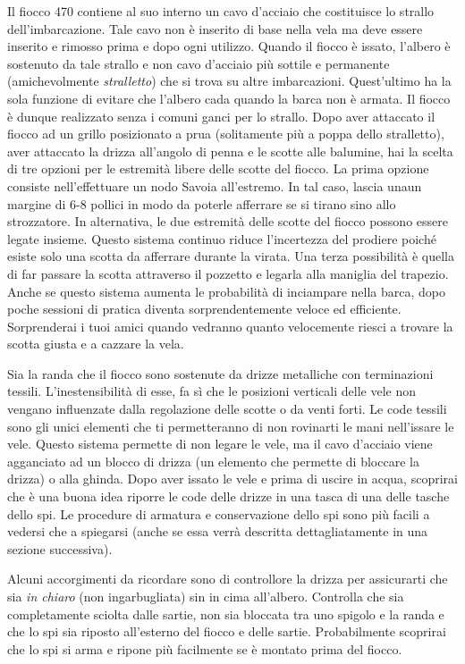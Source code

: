 Il fiocco 470 contiene al suo interno un cavo d'acciaio che costituisce lo
strallo dell'imbarcazione. Tale cavo non è inserito di base nella vela ma deve
essere inserito e rimosso prima e dopo ogni utilizzo. Quando il fiocco è issato,
l'albero è sostenuto da tale strallo e non cavo d'acciaio più sottile e
permanente (amichevolmente \emph{stralletto}) che si trova su altre
imbarcazioni. Quest'ultimo ha la sola funzione di evitare che l'albero cada
quando la barca non è armata. Il fiocco è dunque realizzato senza i comuni ganci
per lo strallo. Dopo aver attaccato il fiocco ad un grillo posizionato
a prua (solitamente più a poppa dello stralletto), aver attaccato la drizza
all'angolo di penna e le scotte alle balumine, hai la
scelta di tre opzioni per le estremità libere delle scotte del fiocco. La prima
opzione consiste nell'effettuare un nodo Savoia all'estremo. In tal caso, lascia
unaun margine di 6-8 pollici in modo da poterle afferrare se si
tirano sino allo strozzatore. In alternativa, le due estremità delle scotte del fiocco
possono essere legate insieme. Questo sistema continuo riduce l'incertezza del
prodiere poiché esiste solo una scotta da afferrare durante la virata. Una terza
possibilità è quella di far passare la scotta attraverso il pozzetto e legarla
alla maniglia del trapezio. Anche se questo sistema aumenta le probabilità
di inciampare nella barca, dopo poche sessioni di pratica diventa
sorprendentemente veloce ed efficiente. Sorprenderai i tuoi amici quando
vedranno quanto velocemente riesci a trovare la scotta giusta e a cazzare la
vela.

Sia la randa che il fiocco sono sostenute da drizze metalliche con terminazioni
tessili. L'inestensibilità di esse, fa sì che le posizioni verticali delle vele
non vengano influenzate dalla
regolazione delle scotte o da venti forti. Le code tessili sono gli unici
elementi che ti permetteranno di non rovinarti le mani nell'issare le vele.
Questo sistema permette di non legare le vele, ma il cavo d'acciaio viene
agganciato ad un blocco di drizza (un elemento che permette di bloccare la
drizza) o alla ghinda. Dopo aver issato le vele e prima di uscire in acqua, scoprirai che è
una buona idea riporre le code delle drizze in una tasca di una delle tasche
dello spi. Le procedure di armatura e conservazione dello spi sono più facili a
vedersi che a spiegarsi (anche se essa verrà descritta dettagliatamente in una sezione successiva).

Alcuni accorgimenti da ricordare sono di controllore la drizza per assicurarti che sia
\emph{in chiaro} (non ingarbugliata) sin in cima all'albero. Controlla che sia completamente sciolta dalle sartie, non sia
bloccata tra uno spigolo e la randa e che lo spi sia riposto
all'esterno del fiocco e delle sartie. Probabilmente scoprirai che lo spi si
arma e ripone più facilmente se è montato prima del fiocco.

